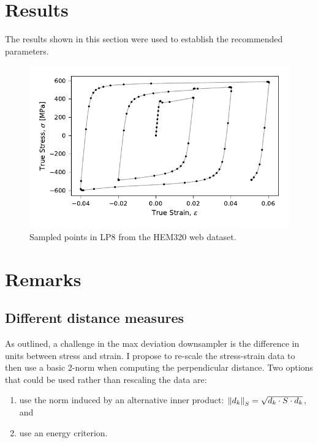 \documentclass[a4paper,11pt]{article}
\begin{document}
\section{Results}

The results shown in this section were used to establish the recommended parameters.

\begin{figure}
    \centering
    \includegraphics{HEM320_C_LP8_inds.pdf}
    \caption{Sampled points in LP8 from the HEM320 web dataset.}
\end{figure}

\section{Remarks}

\subsection{Different distance measures}

As outlined, a challenge in the max deviation downsampler is the difference in units between stress and strain.
I propose to re-scale the stress-strain data to then use a basic 2-norm when computing the perpendicular distance.
Two options that could be used rather than rescaling the data are:
\begin{enumerate}
    \item use the norm induced by an alternative inner product: $\norm{d_k}_S = \sqrt{d_k \cdot S \cdot d_k}$, and
    \item use an energy criterion.
\end{enumerate}
\end{document}
